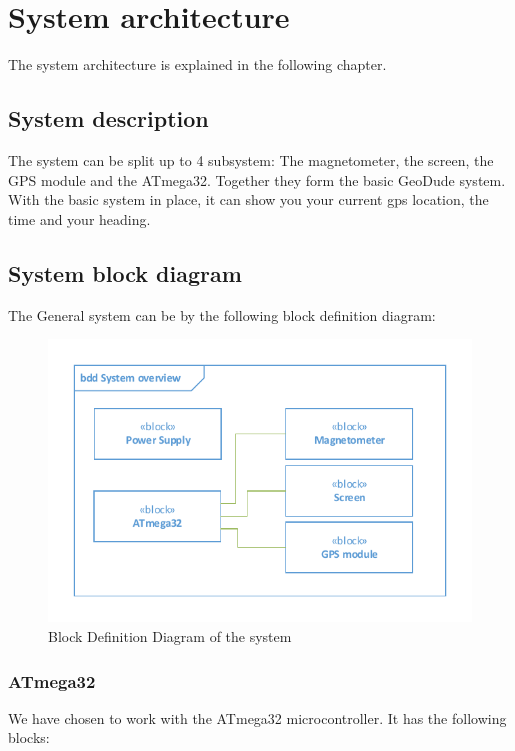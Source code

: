 \chapter{System architecture}
The system architecture is explained in the following chapter.

\section{System description}
The system can be split up to 4 subsystem: The magnetometer, the screen, the GPS module and the ATmega32. Together they form the basic GeoDude system. With the basic system in place, it can show you your current gps location, the time and your heading. \\


\section{System block diagram}
The General system can be by the following block definition diagram:\\
\begin{figure}[H]
	\centering
	\includegraphics[width=.8\textwidth]{billeder/SystemBDD}
	\caption{Block Definition Diagram of the system}
	\label{bdd:system}
\end{figure}

\subsection{ATmega32}
We have chosen to work with the ATmega32 microcontroller. It has the following blocks:\\

